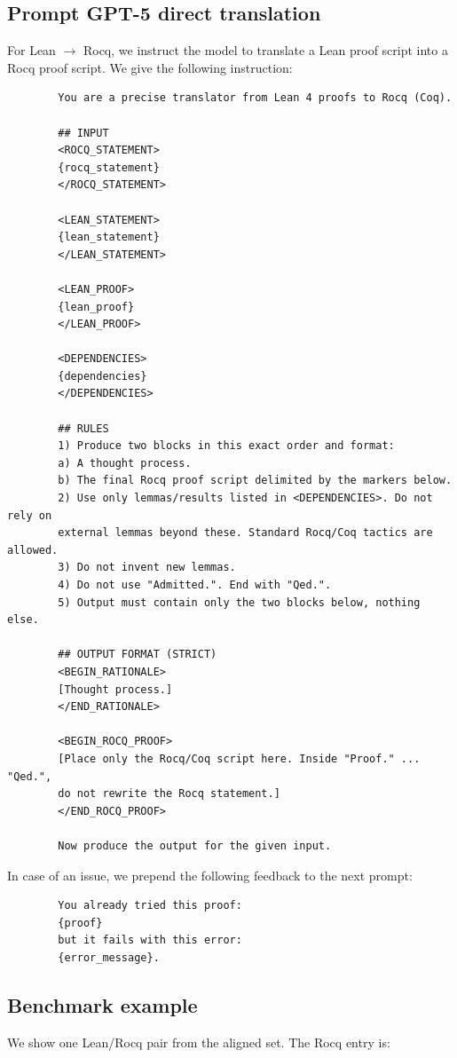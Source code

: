 \documentclass{article}
\theoremstyle{plain}
\theoremstyle{definition}
\theoremstyle{remark}
\begin{document}
	\subsection{Prompt GPT-5 direct translation}
	\label{app:promptgpt}
	For Lean $\to$ Rocq, we instruct the model to translate a Lean proof script into a Rocq proof script. We give the following instruction:
	\begin{verbatim}
		You are a precise translator from Lean 4 proofs to Rocq (Coq).
		
		## INPUT
		<ROCQ_STATEMENT>
		{rocq_statement}
		</ROCQ_STATEMENT>
		
		<LEAN_STATEMENT>
		{lean_statement}
		</LEAN_STATEMENT>
		
		<LEAN_PROOF>
		{lean_proof}
		</LEAN_PROOF>
		
		<DEPENDENCIES>
		{dependencies}
		</DEPENDENCIES>
		
		## RULES
		1) Produce two blocks in this exact order and format:
		a) A thought process.
		b) The final Rocq proof script delimited by the markers below.
		2) Use only lemmas/results listed in <DEPENDENCIES>. Do not rely on
		external lemmas beyond these. Standard Rocq/Coq tactics are allowed.
		3) Do not invent new lemmas.
		4) Do not use "Admitted.". End with "Qed.".
		5) Output must contain only the two blocks below, nothing else.
		
		## OUTPUT FORMAT (STRICT)
		<BEGIN_RATIONALE>
		[Thought process.]
		</END_RATIONALE>
		
		<BEGIN_ROCQ_PROOF>
		[Place only the Rocq/Coq script here. Inside "Proof." ... "Qed.",
		do not rewrite the Rocq statement.]
		</END_ROCQ_PROOF>
		
		Now produce the output for the given input.
	\end{verbatim}
	
	In case of an issue, we prepend the following feedback to the next prompt:
	\begin{verbatim}
		You already tried this proof:
		{proof}
		but it fails with this error:
		{error_message}.
	\end{verbatim}
	
	\subsection{Benchmark example}
	\label{app:benchmark}
	We show one Lean/Rocq pair from the aligned set. The Rocq entry is:
	
\end{document}
